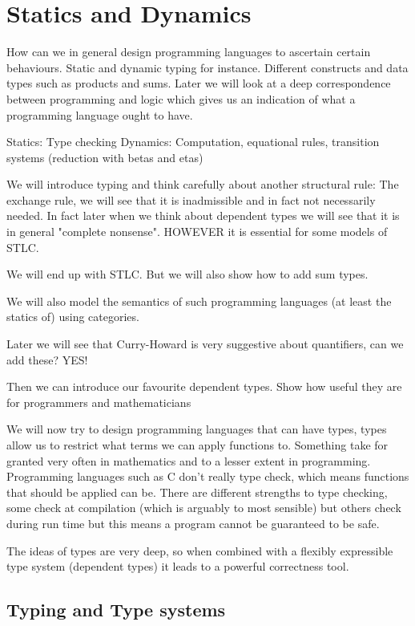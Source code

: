 \section{Statics and Dynamics}

How can we in general design programming languages to ascertain certain behaviours. Static and dynamic typing for instance. Different constructs and data types such as products and sums. Later we will look at a deep correspondence between programming and logic which gives us an indication of what a programming language ought to have.

Statics: Type checking
Dynamics: Computation, equational rules, transition systems (reduction with betas and etas)

We will introduce typing and think carefully about another structural rule: The exchange rule, we will see that it is inadmissible and in fact not necessarily needed. In fact later when we think about dependent types we will see that it is in general "complete nonsense". HOWEVER it is essential for some models of STLC.

We will end up with STLC. But we will also show how to add sum types.

We will also model the semantics of such programming languages (at least the statics of) using categories.

Later we will see that Curry-Howard is very suggestive about quantifiers, can we add these? YES!

Then we can introduce our favourite dependent types. Show how useful they are for programmers and mathematicians

We will now try to design programming languages that can have types, types allow us to restrict what terms we can apply functions to. Something take for granted very often in mathematics and to a lesser extent in programming. Programming languages such as C don't really type check, which means functions that should be applied can be. There are different strengths to type checking, some check at compilation (which is arguably to most sensible) but others check during run time but this means a program cannot be guaranteed to be safe.

The ideas of types are very deep, so when combined with a flexibly expressible type system (dependent types) it leads to a powerful correctness tool.

\subsection{Typing and Type systems}

